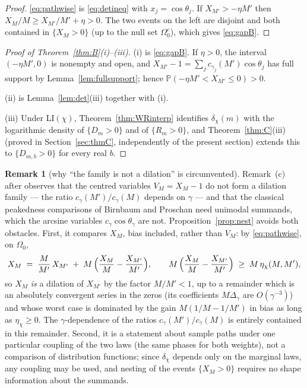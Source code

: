\documentclass[11pt]{amsart}
\theoremstyle{definition}
\newtheorem{remark}[theorem]{Remark}
\numberwithin{equation}{section}
\newcommand{\PP}{\mathbb P}
\begin{document}
\begin{proof}
\eqref{eq:pathwise} is \eqref{eq:detineq} with $x_j=\cos\theta_j$. If
$X_{M'}>-\eta M'$ then $X_M/M\ge X_{M'}/M'+\eta>0$. The two events on
the left are disjoint and both contained in $\{X_M>0\}$ (up to the
null set $\Omega_0^c$), which gives \eqref{eq:gapB}.
\end{proof}

\begin{proof}[Proof of Theorem~\ref{thm:B}(i)--(iii)]
(i) is \eqref{eq:gapB}. If $\eta>0$, the interval $(-\eta M',0)$ is
nonempty and open, and $X_{M'}-1=\sum_jc_{\gamma_j}(M')\cos\theta_j$
has full support by Lemma~\ref{lem:fullsupport}; hence
$\PP(-\eta M'<X_{M'}\le0)>0$.

(ii) is Lemma~\ref{lem:det}(iii) together with (i).

(iii) Under LI$(\chi)$, Theorem~\ref{thm:WRinterp} identifies
$\delta_\chi(m)$ with the logarithmic density of $\{D_m>0\}$ and of
$\{R_m>0\}$, and Theorem~\ref{thm:C}(iii) (proved in
Section~\ref{sec:thmC}, independently of the present section) extends
this to $\{D_{m,b}>0\}$ for every real $b$.
\end{proof}

\begin{remark}[why ``the family is not a dilation'' is circumvented]
\label{rem:dilation}
Remark~(c) after \cite[Conjecture~1]{WR} observes that the centred
variables $V_M=X_M-1$ do not form a dilation family --- the ratio
$c_\gamma(M')/c_\gamma(M)$ depends on $\gamma$ --- and that the
classical peakedness comparisons of Birnbaum and Proschan
\cite{Bir48,Pro65} need unimodal summands, which the arcsine
variables $c_\gamma\cos\theta_\gamma$ are not.
Proposition~\ref{prop:nest} avoids both obstacles. First, it compares
$X_M$, bias included, rather than $V_M$: by \eqref{eq:pathwise}, on
$\Omega_0$,
\[
X_M\;=\;\frac{M}{M'}\,X_{M'}\;+\;M\,\Bigl(\frac{X_M}{M}
-\frac{X_{M'}}{M'}\Bigr),
\qquad
M\,\Bigl(\frac{X_M}{M}-\frac{X_{M'}}{M'}\Bigr)\;\ge\;M\,\eta_\chi(M,M'),
\]
so $X_M$ \emph{is} a dilation of $X_{M'}$ by the factor $M/M'<1$, up
to a remainder which is an absolutely convergent series in the zeros
(its coefficients $M\Delta_\gamma$ are $O(\gamma^{-3})$) and whose
worst case is dominated by the gain $M(1/M-1/M')$ in bias as long as
$\eta_\chi\ge0$. The $\gamma$-dependence of the ratios
$c_\gamma(M')/c_\gamma(M)$ is entirely contained in this remainder.
Second, it is a statement about sample paths under one particular
coupling of the two laws (the same phases for both weights), not a
comparison of distribution functions; since $\delta_\chi$ depends
only on the marginal laws, any coupling may be used, and nesting of
the events $\{X_M>0\}$ requires no shape information about the
summands.
\end{remark}
\end{document}
